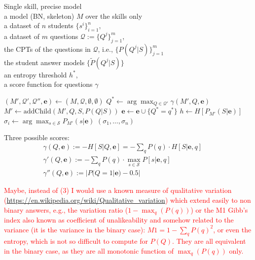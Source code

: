 \documentclass[runningheads]{llncs}
\begin{document}
	\begin{algorithm}[htp!]
		\caption{Single skill, precise model\\
			a model (BN, skeleton) $M$ over the skills only
			\\a dataset of $n$ students $\{s^i\}_{i=1}^n$,\\a dataset of $m$ questions 
			$\mathcal{Q}:=\{Q^j\}_{j=1}^m$,\\
			the CPTs of the questions in $\mathcal{Q}$, i.e., $\{P(Q^j|S)\}_{j=1}^m$\\
			the student answer models $\{\tilde{P}(Q^j|S)\}$\\
			an entropy threshold $h^*$,\\
			a score function for questions $\gamma$
			\label{alg:simple}}
		\begin{algorithmic}[1]
			\STATE $(M',\mathcal{Q}',\mathcal{Q}'',\bm{e}) \gets 
			(M,\mathcal{Q},\emptyset,\emptyset)$
			\STATE $Q^* \gets \arg\max_{Q \in \mathcal{Q}'}\gamma(M',Q,\bm{e})$
			\STATE $M' \gets \mathrm{addChild}(M',Q,S,P(Q|S))$
			\STATE $\bm{e} \gets \bm{e} \cup \{ Q^*=q^* \}$
			\STATE $h \gets H[P_{M'}(S|\bm{e})]$
			\ENDWHILE
			\STATE $\sigma_i \gets \arg\max_{s\in\mathcal{S}} P_{M'}(s|\bm{e})$
			\ENDFOR
			 $(\sigma_1,\ldots,\sigma_n)$
		\end{algorithmic}
	\end{algorithm}
	Three possible scores:
	\begin{eqnarray}
		\gamma(Q,\bm{e}) := -H[S|Q,\bm{e}] = -\sum_q P(q) \cdot H[S|\bm{e},q]&&\\
		\gamma'(Q,\bm{e}) :=  -\sum_q P(q) \cdot \max_{s\in\mathcal{S}}  P[s|\bm{e},q]&&\\
		\gamma''(Q,\bm{e}) :=  |P(Q=1|\bm{e})-0.5|&&
	\end{eqnarray}
	
	\textcolor{red}{Maybe, instead of (3) I would use a known measure of qualitative 
	variation (\url{https://en.wikipedia.org/wiki/Qualitative_variation}) which extend easily to 
	non binary answers, e.g., the variation ratio ($1-\max_q(P(q))$) or the M1 Gibb's index 
	also known as coefficient of unalikeability and somehow related to the variance (it is 
	the variance in the binary case): $M1 = 1-\sum_q P(q)^2$, or even the entropy, which is 
	not so difficult to compute for $P(Q)$. They are all equivalent in the binary case, as 
	they are all monotonic function of $\max_q(P(q))$ only. }
	
\end{document}
